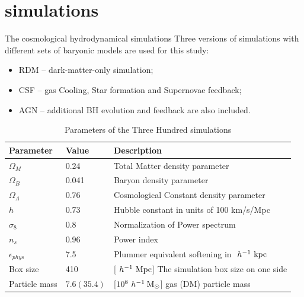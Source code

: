 \documentclass[aspectratio=43]{beamer}
\newcommand{\hMsun}{~h^{-1}\>{\rm M_\odot}}
\newcommand{\Mpc}{~h^{-1}~{\rm Mpc}}
\newcommand{\Kpc}{~h^{-1}~{\rm kpc}}
\begin{document}
\section{simulations}
\begin{frame}{The cosmological hydrodynamical simulations}
Three versions of simulations with different sets of baryonic models are used for this study:
\begin{itemize}
    \item RDM -- dark-matter-only simulation; 
    \item CSF -- gas Cooling, Star formation and Supernovae feedback;
    \item AGN -- additional BH evolution and feedback are also included.
\end{itemize}
\vspace{-0.6cm}
\begin{table}
\fontsize{9}{9}\selectfont
\caption{Parameters of the Three Hundred simulations}
\begin{tabular}{lll}
  \hline
  Parameter& Value & Description\\
  \hline
  $\Omega_M$ & 0.24 & Total Matter density parameter\\
  $\Omega_B$ & 0.041 & Baryon density parameter\\
  $\Omega_\Lambda$ & 0.76 & Cosmological Constant density parameter\\
  $h$ & 0.73  & Hubble constant in units of 100 km/s/Mpc\\
  $\sigma_8$ & 0.8 & Normalization of Power spectrum\\
  $n_s$ & 0.96  & Power index\\
  $\epsilon_{phys}$ & 7.5 & Plummer equivalent softening in $\Kpc$ \\
  Box size & 410 & [$\Mpc$] The simulation box size on one side \\
  Particle mass & $7.6 (35.4) $ & [$10^8 \hMsun$] gas (DM) particle mass \\
  \hline
\end{tabular}
\end{table}
\end{frame}
\end{document}
